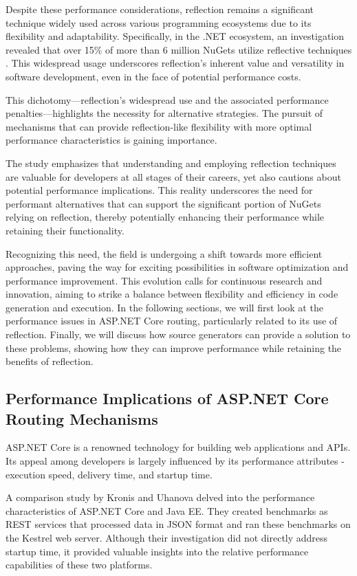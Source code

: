 Despite these performance considerations, reflection remains a significant technique widely used across various programming ecosystems due to its flexibility and adaptability. Specifically, in the .NET ecosystem, an investigation revealed that over 15\% of more than 6 million NuGets utilize reflective techniques \cite{Beaumont2022}. This widespread usage underscores reflection's inherent value and versatility in software development, even in the face of potential performance costs.

This dichotomy—reflection's widespread use and the associated performance penalties—highlights the necessity for alternative strategies. The pursuit of mechanisms that can provide reflection-like flexibility with more optimal performance characteristics is gaining importance.

The study \cite{Beaumont2022} emphasizes that understanding and employing reflection techniques are valuable for developers at all stages of their careers, yet also cautions about potential performance implications. This reality underscores the need for performant alternatives that can support the significant portion of NuGets relying on reflection, thereby potentially enhancing their performance while retaining their functionality.

Recognizing this need, the field is undergoing a shift towards more efficient approaches, paving the way for exciting possibilities in software optimization and performance improvement. This evolution calls for continuous research and innovation, aiming to strike a balance between flexibility and efficiency in code generation and execution. In the following sections, we will first look at the performance issues in ASP.NET Core routing, particularly related to its use of reflection. Finally, we will discuss how source generators can provide a solution to these problems, showing how they can improve performance while retaining the benefits of reflection.

\subsection{Performance Implications of ASP.NET Core Routing Mechanisms}

ASP.NET Core is a renowned technology for building web applications and APIs. Its appeal among developers is largely influenced by its performance attributes - execution speed, delivery time, and startup time.

A comparison study by Kronis and Uhanova \cite{Kronis2018} delved into the performance characteristics of ASP.NET Core and Java EE. They created benchmarks as REST services that processed data in JSON format and ran these benchmarks on the Kestrel web server. Although their investigation did not directly address startup time, it provided valuable insights into the relative performance capabilities of these two platforms.


